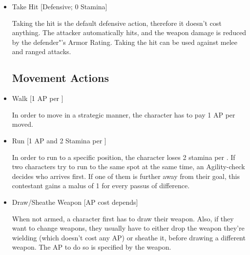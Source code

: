 \begin{itemize}
\item Take Hit [Defensive; 0 Stamina]

Taking the hit is the default defensive action, therefore it doesn't cost anything.
The attacker automatically hits, and the weapon damage is reduced by the defender"'s Armor Rating.
Taking the hit can be used against melee and ranged attacks.


\subsection{Movement Actions}\label{subsec:movementCombatActions}

\item Walk [1 AP per ]

In order to move in a strategic manner, the character has to pay 1 AP per  moved.


\item Run [1 AP and 2 Stamina per ]

In order to run to a specific position, the character loses 2 stamina per .
If two characters try to run to the same spot at the same time, an Agility-check decides who arrives first.
If one of them is further away from their goal, this contestant gains a malus of 1 for every passus of difference.


\item Draw/Sheathe Weapon [AP cost depends]

When not armed, a character first has to draw their weapon.
Also, if they want to change weapons, they usually have to either drop the weapon they're wielding (which doesn't cost any AP) or sheathe it, before drawing a different weapon.
The AP to do so is specified by the weapon.


\end{itemize}